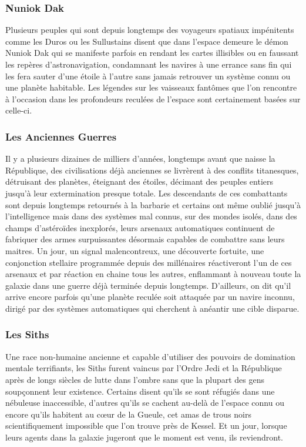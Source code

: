\documentclass[twoside]{article}
\begin{document}
\subsubsection{Nuniok Dak}
Plusieurs peuples qui sont depuis longtemps des voyageurs spatiaux impénitents comme les Duros ou les Sullustains disent que dans l'espace demeure le démon Nuniok Dak qui se manifeste parfois en rendant les cartes illisibles ou en faussant les repères d'astronavigation, condamnant les navires à une errance sans fin qui les fera sauter d'une étoile à l'autre sans jamais retrouver un système connu ou une planète habitable. Les légendes sur les vaisseaux fantômes que l'on rencontre à l'occasion dans les profondeurs reculées de l'espace sont certainement basées sur celle-ci.

\subsubsection{Les Anciennes Guerres}
Il y a plusieurs dizaines de milliers d'années, longtemps avant que naisse la République, des civilisations déjà anciennes se livrèrent à des conflits titanesques, détruisant des planètes, éteignant des étoiles, décimant des peuples entiers jusqu'à leur extermination presque totale. Les descendants de ces combattants sont depuis longtemps retournés à la barbarie et certains ont même oublié jusqu'à l'intelligence mais dans des systèmes mal connus, sur des mondes isolés, dans des champs d'astéroïdes inexplorés, leurs arsenaux automatiques continuent de fabriquer des armes surpuissantes désormais capables de combattre sans leurs maitres. Un jour, un signal malencontreux, une découverte fortuite, une conjonction stellaire programmée depuis des millénaires réactiveront l'un de ces arsenaux et par réaction en chaine tous les autres, enflammant à nouveau toute la galaxie dans une guerre déjà terminée depuis longtemps. D'ailleurs, on dit qu'il arrive encore parfois qu'une planète reculée soit attaquée par un navire inconnu, dirigé par des systèmes automatiques qui cherchent à anéantir une cible disparue.

\subsubsection{Les Siths}
Une race non-humaine ancienne et capable d'utiliser des pouvoirs de domination mentale terrifiants, les Siths furent vaincus par l'Ordre Jedi et la République après de longs siècles de lutte dans l'ombre sans que la plupart des gens soupçonnent leur existence. Certains disent qu'ils se sont réfugiés dans une nébuleuse inaccessible, d'autres qu'ils se cachent au-delà de l'espace connu ou encore qu'ils habitent au c\oe ur de la Gueule, cet amas de trous noirs scientifiquement impossible que l'on trouve près de Kessel. Et un jour, lorsque leurs agents dans la galaxie jugeront que le moment est venu, ils reviendront.
\end{document}
